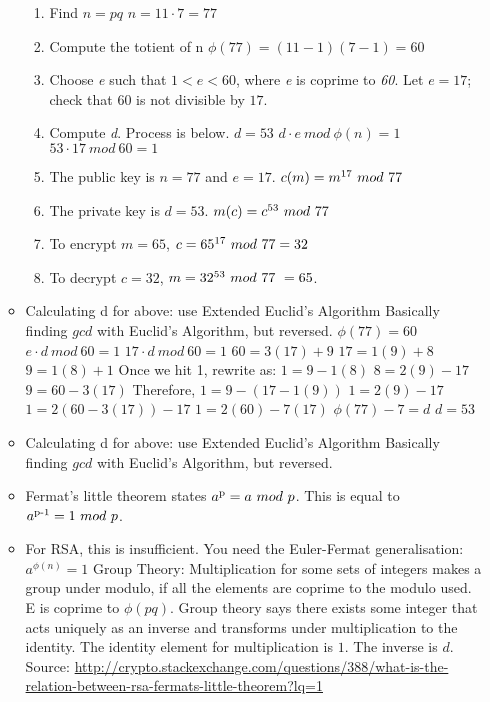 \documentclass{article}
\begin{document}
\begin{itemize}
\begin{itemize}
\begin{enumerate}
          \item Find $ n = pq $
            \subitem $ n = 11 \cdot 7 = 77 $
          \item Compute the totient of n
            \subitem $ \phi(77) = (11 - 1)(7 - 1) = 60 $
          \item Choose \emph{e} such that $ 1 < e < 60 $, where \emph{e} is coprime to \emph{60}. 
            \subitem Let $ e = 17 $; check that $ 60 $ is not divisible by $ 17 $.
          \item Compute \emph{d}. Process is below.
            \subitem $ d = 53 $
            \subitem $ d \cdot e\ mod\ \phi(n) = 1 $
            \subitem $ 53 \cdot 17\ mod\ 60 = 1 $
          \item The public key is $ n = 77 $ and $ e = 17 $. 
            \subitem $ c(m) = m\textsuperscript{17}\ mod\ 77 $
          \item The private key is $ d = 53 $.
            \subitem $ m(c) = c\textsuperscript{53}\ mod\ 77 $
          \item To encrypt $ m = 65 $, 
            \subitem $ c = 65\textsuperscript{17}\ mod\ 77 = 32 $
          \item To decrypt $ c = 32 $, 
            \subitem $ m = 32\textsuperscript{53}\ mod\ 77\ = 65 $. 
        \end{enumerate}
      \item Calculating d for above: use Extended Euclid's Algorithm 
        \subitem Basically finding $ gcd $ with Euclid's Algorithm, but reversed.
    \subitem $ \phi(77) = 60 $
    \subitem $ e \cdot d\ mod\ 60 = 1 $
    \subitem $ 17 \cdot d\ mod\ 60 = 1 $
    \subitem $ 60 = 3(17) + 9 $
    \subitem $ 17 = 1(9) + 8 $
    \subitem $ 9 = 1(8) + 1 $
    \subitem Once we hit 1, rewrite as:
    \subitem $ 1 = 9 - 1(8) $
    \subitem $ 8 = 2(9) - 17 $
    \subitem $ 9 = 60 - 3(17) $
    \subitem Therefore,
    \subitem $ 1 = 9 - (17 - 1(9)) $
    \subitem $ 1 = 2(9) - 17 $
    \subitem $ 1 = 2(60 - 3(17)) - 17 $
    \subitem $ 1 = 2(60) - 7(17) $
    \subitem $ \phi(77) - 7 = d $
    \subitem $ d = 53 $
  \item Calculating d for above: use Extended Euclid's Algorithm 
    \subitem Basically finding $ gcd $ with Euclid's Algorithm, but reversed.
  \item Fermat's little theorem states $ a\textsuperscript{p} = a\ mod\ p $. This is equal to
  $ a\textsuperscript{p-1}=1\ mod\ p $. 
  \item For RSA, this is insufficient. You need the Euler-Fermat generalisation:
    \subitem $a^{\phi(n)} = 1$
    \subitem Group Theory: Multiplication for some sets of integers makes a group under modulo, if all the elements are coprime to the modulo used.
    \subitem E is coprime to $\phi(pq)$. Group theory says there exists some integer that acts uniquely as an inverse and transforms
    under multiplication to the identity.
    \subitem The identity element for multiplication is $1$. The inverse is $d$.
    \subitem Source: \url{http://crypto.stackexchange.com/questions/388/what-is-the-relation-between-rsa-fermats-little-theorem?lq=1}
\end{itemize}


\end{itemize}
\end{document}
